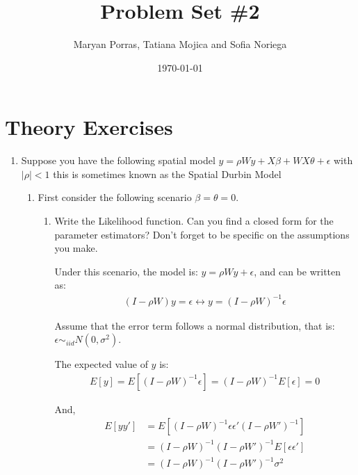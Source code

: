 \documentclass[12pt]{article}
\title{\textbf{Problem Set \#2}} %
\author{Maryan Porras, Tatiana Mojica and Sofia Noriega}
\date{\today} %
\begin{document}
\setlength{\droptitle}{-5em}    
\maketitle


\section{Theory Exercises}

\begin{enumerate}
  \item Suppose you have the following spatial model $y=\rho W y + X\beta + WX\theta  +\epsilon$ with $|\rho|<1$  this is sometimes known as the Spatial Durbin Model
  \begin{enumerate}
    \item First consider the following scenario  $\beta=\theta=0$. 
    \begin{enumerate}
      \item Write the Likelihood function. Can you find a closed form for the parameter estimators? Don't forget to be specific on the assumptions you make.
      
      Under this scenario, the model is: $y=\rho W y +\epsilon$, and can be written as:
      \begin{align*}
          (I-\rho W)y = \epsilon \longleftrightarrow y = (I-\rho W)^{-1} \epsilon
      \end{align*}
      
      Assume that the error term follows a normal distribution, that is: $\epsilon \sim_{iid} N(0,\sigma^2)$.
      
      The expected value of $y$ is:
      \begin{align}
          E[y] = E[(I-\rho W)^{-1} \epsilon] = (I-\rho W)^{-1} E[ \epsilon ] = 0 \label{ExpectedValue} 
      \end{align}
      
      And, 
      \begin{align}
          E[yy'] &= E[(I-\rho W)^{-1} \epsilon \epsilon' (I-\rho W')^{-1}] \nonumber\\
          &= (I-\rho W)^{-1} (I-\rho W')^{-1} E[ \epsilon \epsilon' ] \nonumber\\
          &= (I-\rho W)^{-1} (I-\rho W')^{-1} \sigma^2 \label{Squared}
      \end{align}
      

\end{enumerate}
\end{enumerate}
\end{enumerate}
\end{document}
